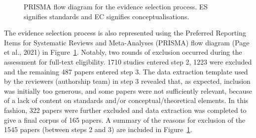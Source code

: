 \documentclass[
  letterpaper,
  DIV=11,
  numbers=noendperiod]{scrartcl}
\begin{document}
\begin{figure}


\caption{\label{fig-figA1}PRISMA flow diagram for the evidence selection
process. ES signifies standards and EC signifies conceptualisations.}

\end{figure}%

The evidence selection process is also represented using the Preferred
Reporting Items for Systematic Reviews and Meta-Analyses (PRISMA) flow
diagram (Page et al., 2021) in Figure~\ref{fig-figA1}. Notably, two
rounds of exclusion occurred during the assessment for full-text
eligibility. 1710 studies entered step 2, 1223 were excluded and the
remaining 487 papers entered step 3. The data extraction template used
by the reviewers (authorship team) in step 3 revealed that, as expected,
inclusion was initially too generous, and some papers were not
sufficiently relevant, because of a lack of content on standards and/or
conceptual/theoretical elements. In this fashion, 322 papers were
further excluded and data extraction was completed to give a final
corpus of 165 papers. A summary of the reasons for exclusion of the 1545
papers (between steps 2 and 3) are included in Figure~\ref{fig-figA1}.
\end{document}
